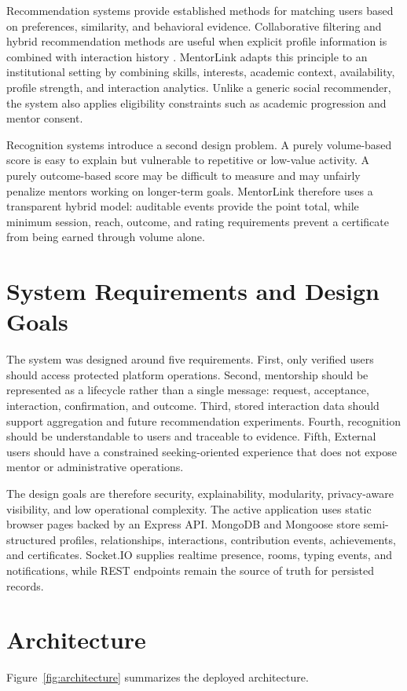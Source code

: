\documentclass[conference]{IEEEtran}
\begin{document}
Recommendation systems provide established methods for matching users based on preferences, similarity, and behavioral evidence. Collaborative filtering and hybrid recommendation methods are useful when explicit profile information is combined with interaction history \cite{resnick1997,burke2002,ekstrand2011}. MentorLink adapts this principle to an institutional setting by combining skills, interests, academic context, availability, profile strength, and interaction analytics. Unlike a generic social recommender, the system also applies eligibility constraints such as academic progression and mentor consent.

Recognition systems introduce a second design problem. A purely volume-based score is easy to explain but vulnerable to repetitive or low-value activity. A purely outcome-based score may be difficult to measure and may unfairly penalize mentors working on longer-term goals. MentorLink therefore uses a transparent hybrid model: auditable events provide the point total, while minimum session, reach, outcome, and rating requirements prevent a certificate from being earned through volume alone.

\section{System Requirements and Design Goals}
The system was designed around five requirements. First, only verified users should access protected platform operations. Second, mentorship should be represented as a lifecycle rather than a single message: request, acceptance, interaction, confirmation, and outcome. Third, stored interaction data should support aggregation and future recommendation experiments. Fourth, recognition should be understandable to users and traceable to evidence. Fifth, External users should have a constrained seeking-oriented experience that does not expose mentor or administrative operations.

The design goals are therefore security, explainability, modularity, privacy-aware visibility, and low operational complexity. The active application uses static browser pages backed by an Express API. MongoDB and Mongoose store semi-structured profiles, relationships, interactions, contribution events, achievements, and certificates. Socket.IO supplies realtime presence, rooms, typing events, and notifications, while REST endpoints remain the source of truth for persisted records.

\section{Architecture}
Figure~\ref{fig:architecture} summarizes the deployed architecture.
\end{document}
